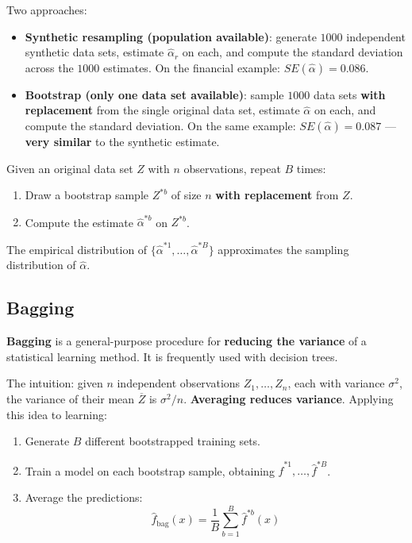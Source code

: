\documentclass[11pt,a4paper]{article}
\theoremstyle{definition}
\theoremstyle{plain}
\theoremstyle{remark}
\begin{document}
Two approaches:
\begin{itemize}
    \item \textbf{Synthetic resampling (population available)}: generate $1000$ independent synthetic data sets, estimate $\hat{\alpha}_r$ on each, and compute the standard deviation across the $1000$ estimates. On the financial example: $SE(\hat{\alpha}) = 0.086$.
    \item \textbf{Bootstrap (only one data set available)}: sample $1000$ data sets \textbf{with replacement} from the single original data set, estimate $\hat{\alpha}$ on each, and compute the standard deviation. On the same example: $SE(\hat{\alpha}) = 0.087$ — \textbf{very similar} to the synthetic estimate.
\end{itemize}

\begin{tcolorbox}[colback=blue!5!white,colframe=blue!75!black,title=\textbf{Bootstrap Procedure}]
Given an original data set $Z$ with $n$ observations, repeat $B$ times:
\begin{enumerate}
    \item Draw a bootstrap sample $Z^{*b}$ of size $n$ \textbf{with replacement} from $Z$.
    \item Compute the estimate $\hat{\alpha}^{*b}$ on $Z^{*b}$.
\end{enumerate}
The empirical distribution of $\{\hat{\alpha}^{*1}, \ldots, \hat{\alpha}^{*B}\}$ approximates the sampling distribution of $\hat{\alpha}$.
\end{tcolorbox}

\subsection{Bagging}

\begin{tcolorbox}[colback=blue!5!white,colframe=blue!75!black,title=\textbf{Bootstrap Aggregation (Bagging)}]
\textbf{Bagging} is a general-purpose procedure for \textbf{reducing the variance} of a statistical learning method. It is frequently used with decision trees.
\end{tcolorbox}

The intuition: given $n$ independent observations $Z_1, \ldots, Z_n$, each with variance $\sigma^2$, the variance of their mean $\overline{Z}$ is $\sigma^2 / n$. \textbf{Averaging reduces variance}. Applying this idea to learning:
\begin{enumerate}
    \item Generate $B$ different bootstrapped training sets.
    \item Train a model on each bootstrap sample, obtaining $\hat{f}^{*1}, \ldots, \hat{f}^{*B}$.
    \item Average the predictions:
    \[
        \hat{f}_{\mathrm{bag}}(x) = \frac{1}{B} \sum_{b=1}^{B} \hat{f}^{*b}(x)
    \]
\end{enumerate}
\end{document}
